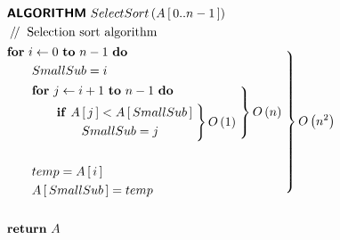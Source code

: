 \begin{fleqn}
	\begin{align*}
		& \text{\textbf{\textsf{ALGORITHM}}} \ SelectSort\left( A\left[ \,0..n-1\, \right] \right) \\
		& \mathbin{/\mkern-3mu/} \text{ Selection sort algorithm} \\
		& \begin{aligned}
			& \text{\textbf{for}} \ i \leftarrow 0 \ \text{\textbf{to}} \ n - 1 \ \text{\textbf{do}} \ \\
			& \qquad SmallSub = i \\
			& \begin{aligned}
				& \qquad \text{\textbf{for}} \ j \leftarrow i + 1 \ \text{\textbf{to}} \ n - 1 \ \text{\textbf{do}} \ \\
				& \begin{aligned}
					& \qquad \qquad \text{\textbf{if}} \ A\left[ \,j\, \right] < A\left[ \,SmallSub\, \right] \\
					& \qquad \qquad \qquad SmallSub = j 
				\end{aligned} \left.\vphantom{\begin{aligned}\\\\\end{aligned}} \right\} O\left( 1 \right) 
			\end{aligned} \left.\vphantom{\begin{aligned}\\\\\\\end{aligned}} \right\} O\left( n \right) \\
			& \\
			& \qquad temp = A\left[ \,i\, \right] \\
			& \qquad A\left[ \,SmallSub\, \right] = temp 
		\end{aligned} \left.\vphantom{\begin{aligned}\\\\\\\\\\\\\\\\\end{aligned}} \right\} O\left( n^2 \right) \\
		& \\
		& \text{\textbf{return}} \ A
	\end{align*}
\end{fleqn}